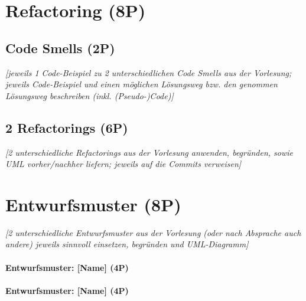 \chapter{Refactoring (8P)}
\pagestyle{scrheadings}
\clearscrheadfoot
{}
\setcounter{page}{7}
\ofoot[\pagemark]{\pagemark}
\onehalfspacing

\section{Code Smells (2P)}
\emph{[jeweils 1 Code-Beispiel zu 2 unterschiedlichen Code Smells aus der Vorlesung; jeweils Code-Beispiel
und einen möglichen Lösungsweg bzw. den genommen Lösungsweg beschreiben (inkl. (Pseudo-)Code)]}

\section{2 Refactorings (6P)}
\emph{[2 unterschiedliche Refactorings aus der Vorlesung anwenden, begründen, sowie UML vorher/nachher
liefern; jeweils auf die Commits verweisen]}

\newpage
\titlespacing*{\chapter}{0pt}{-30mm}{10pt}
  
\chapter{Entwurfsmuster (8P)}
\pagestyle{scrheadings}
\clearscrheadfoot
{}
\setcounter{page}{8}
\ofoot[\pagemark]{\pagemark}
\onehalfspacing

\emph{[2 unterschiedliche Entwurfsmuster aus der Vorlesung (oder nach Absprache auch andere) jeweils
sinnvoll einsetzen, begründen und UML-Diagramm]}

\subsubsection{Entwurfsmuster: [Name] (4P)}
\subsubsection{Entwurfsmuster: [Name] (4P)}

